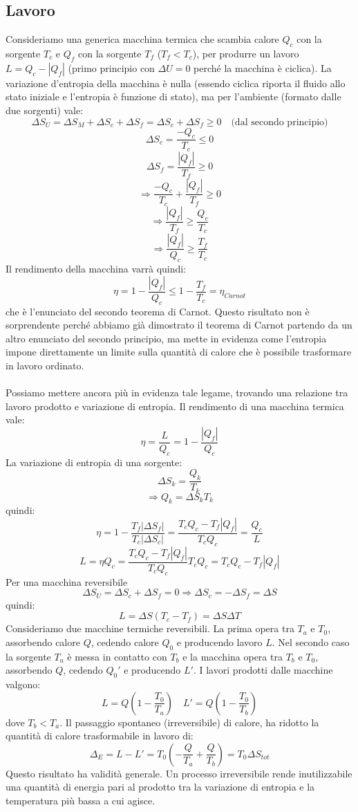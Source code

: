 \documentclass{article}
\begin{document}
\subsection{Lavoro}
Consideriamo una generica macchina termica che scambia calore $Q_c$ con la sorgente $T_c$ e $Q_f$ con la sorgente $T_f$ ($T_f<T_c$), per produrre un lavoro $L=Q_c-|Q_f|$ (primo principio con $\Delta U=0$ perché la macchina è ciclica). La variazione d'entropia della macchina è nulla (essendo ciclica riporta il fluido allo stato iniziale e l'entropia è funzione di stato), ma per l'ambiente (formato dalle due sorgenti) vale:
$$ \Delta S_U=\Delta S_M+\Delta S_c+\Delta S_f = \Delta S_c+\Delta S_f \geq0 \quad\text{(dal secondo principio)}$$
$$ \Delta S_c = \frac{-Q_c}{T_c}\leq 0 $$
$$ \Delta S_f = \frac{|Q_f|}{T_f}\geq 0 $$
$$\Rightarrow \frac{-Q_c}{T_c}+\frac{|Q_f|}{T_f}\geq 0 $$
$$\Rightarrow \frac{|Q_f|}{T_f}\geq \frac{Q_c}{T_c} $$
$$\Rightarrow \frac{|Q_f|}{Q_c}\geq \frac{T_f}{T_c} $$
Il rendimento della macchina varrà quindi:
$$ \eta=1-\frac{|Q_f|}{Q_c}\leq 1-\frac{T_f}{T_c}=\eta_{Carnot} $$
che è l'enunciato del secondo teorema di Carnot. Questo risultato non è sorprendente perché abbiamo già dimostrato il teorema di Carnot partendo da un altro enunciato del secondo principio, ma mette in evidenza come l'entropia impone direttamente un limite sulla quantità di calore che è possibile trasformare in lavoro ordinato.\\\\
Possiamo mettere ancora più in evidenza tale legame, trovando una relazione tra lavoro prodotto e variazione di entropia. Il rendimento di una macchina termica vale:
$$ \eta = \frac{L}{Q_c} = 1 - \frac{|Q_f|}{Q_c} $$
La variazione di entropia di una sorgente:
$$ \Delta S_k = \frac{Q_k}{T_k} $$
$$ \Rightarrow Q_k = \Delta S_k T_k  $$
quindi:
$$ \eta = 1 - \frac{T_f|\Delta S_f|}{T_c|\Delta S_c|} = \frac{T_cQ_c-T_f|Q_f|}{T_cQ_c} = \frac{Q_c}{L} $$
$$ L = \eta Q_c = \frac{T_cQ_c-T_f|Q_f|}{T_cQ_c} T_cQ_c = T_cQ_c-T_f|Q_f| $$
Per una macchina reversibile
$$\Delta S_U = \Delta S_c+\Delta S_f =0\Rightarrow \Delta S_c = -\Delta S_f = \Delta S$$
quindi:
$$ L = \Delta S(T_c-T_f) = \Delta S\Delta T $$
Consideriamo due macchine termiche reversibili. La prima opera tra $T_a$ e $T_0$, assorbendo calore $Q$, cedendo calore $Q_0$ e producendo lavoro $L$. Nel secondo caso la sorgente $T_a$ è messa in contatto con $T_b$ e la macchina opera tra $T_b$ e $T_0$, assorbendo $Q$, cedendo $Q_0'$ e producendo $L'$. I lavori prodotti dalle macchine valgono:
$$ L = Q\left( 1-\frac{T_0}{T_a} \right) \quad L' = Q\left( 1-\frac{T_0}{T_b} \right) $$
dove $T_b<T_a$. Il passaggio spontaneo (irreversibile) di calore, ha ridotto la quantità di calore trasformabile in lavoro di:
$$ \Delta_E = L-L' = T_0\left( -\frac{Q}{T_a}+\frac{Q}{T_b} \right) = T_0\Delta S_{tot} $$
Questo risultato ha validità generale. Un processo irreversibile rende inutilizzabile una quantità di energia pari al prodotto tra la variazione di entropia e la temperatura più bassa a cui agisce.
\end{document}
